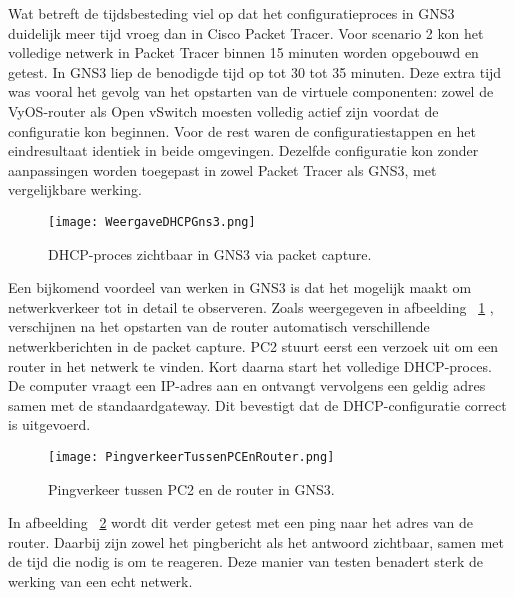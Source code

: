 \vspace{0.3cm}

Wat betreft de tijdsbesteding viel op dat het configuratieproces in GNS3 duidelijk meer tijd vroeg dan in Cisco Packet Tracer. Voor scenario 2 kon het volledige netwerk in Packet Tracer binnen 15 minuten worden opgebouwd en getest. In GNS3 liep de benodigde tijd op tot 30 tot 35 minuten. Deze extra tijd was vooral het gevolg van het opstarten van de virtuele componenten: zowel de VyOS-router als Open vSwitch moesten volledig actief zijn voordat de configuratie kon beginnen. Voor de rest waren de configuratiestappen en het eindresultaat identiek in beide omgevingen. Dezelfde configuratie kon zonder aanpassingen worden toegepast in zowel Packet Tracer als GNS3, met vergelijkbare werking.

\vspace{0.3cm}

\begin{figure}[H]
    \centering
    \texttt{[image: WeergaveDHCPGns3.png]}
    \caption{DHCP-proces zichtbaar in GNS3 via packet capture.}
    \label{fig:dhcp_gns3}
\end{figure}


Een bijkomend voordeel van werken in GNS3 is dat het mogelijk maakt om netwerkverkeer tot in detail te observeren. Zoals weergegeven in afbeelding ~\ref{fig:dhcp_gns3} , verschijnen na het opstarten van de router automatisch verschillende netwerkberichten in de packet capture. PC2 stuurt eerst een verzoek uit om een router in het netwerk te vinden. Kort daarna start het volledige DHCP-proces. De computer vraagt een IP-adres aan en ontvangt vervolgens een geldig adres samen met de standaardgateway. Dit bevestigt dat de DHCP-configuratie correct is uitgevoerd.

\vspace{0.3cm}

\begin{figure}[H]
    \centering
    \texttt{[image: PingverkeerTussenPCEnRouter.png]}
    \caption{Pingverkeer tussen PC2 en de router in GNS3.}
    \label{fig:ping_gns3}
\end{figure}

In afbeelding ~\ref{fig:ping_gns3} wordt dit verder getest met een ping naar het adres van de router. Daarbij zijn zowel het pingbericht als het antwoord zichtbaar, samen met de tijd die nodig is om te reageren. Deze manier van testen benadert sterk de werking van een echt netwerk.

